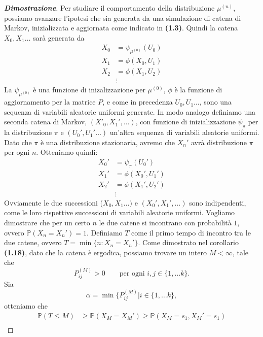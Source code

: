 \documentclass{article}
\theoremstyle{definition}
\theoremstyle{definition}
\theoremstyle{remark}
\begin{document}
\begin{proof}[\textbf{Dimostrazione}]
    Per studiare il comportamento della distribuzione $\mu^{(n)}$, possiamo avanzare l'ipotesi che sia generata da una simulazione
    di catena di Markov, inizializzata e aggiornata come indicato in \textbf{(1.3)}. Quindi la catena $X_0,X_1\dots$ sarà generata da
    \begin{align*}
        X_0 & = \psi_{\mu^{(0)}}(U_0) \\
        X_1 & = \phi(X_0,U_1)         \\
        X_2 & = \phi(X_1,U_2)         \\
            & \vdots
    \end{align*}
    La $\psi_{\mu^{(0)}}$ è  una funzione di inizalizzazione per $\mu^{(0)}$, $\phi$ è la funzione di aggiornamento per la matrice $P$, e come in precedenza
    $U_0,U_1\dots$, sono una sequenza di variabili aleatorie uniformi generate.
    In modo analogo definiamo una seconda catena di Markov, $(X'_0,X_1',\dots)$, con funzione di inizializzazione $\psi_{\pi}$ per la distribuzione $\pi$ e $(U_0',U_1'\dots)$ un'altra sequenza di variabili aleatorie uniformi.
    Dato che $\pi$ è una distribuzione stazionaria, avremo che $X_n'$ avrà distribuzione $\pi$ per ogni $n$. Otteniamo quindi:
    \begin{align*}
        X_0' & = \psi_{\pi}(U_0') \\
        X_1' & = \phi(X_0',U_1')  \\
        X_2' & = \phi(X_1',U_2')  \\
             & \vdots
    \end{align*}
    Ovviamente le due successioni ($X_0,X_1\dots)$ e $(X_0',X_1',\dots)$ sono indipendenti, come le loro rispettive successioni di variabili aleatorie uniformi. Vogliamo dimostrare che per un certo $n$ le due catene si incontrano con probabilità $1$, ovvero $\mathbb{P}(X_n = X_n') = 1$.
    Definiamo $T$ come il primo tempo di incontro tra le due catene, ovvero $T  =\min\{n:X_n = X_n'\}$. Come dimostrato nel corollario \textbf{(1.18)}, dato che la catena è ergodica, possiamo trovare un intero $M<\infty$, tale che
    $$P_{ij}^{(M)}>0\qquad \text{per ogni }i,j\in\{1,\dots k\}.$$
    Sia
    $$\alpha = \min\{P_{ij}^{(M)}| i\in\{1,\dots k\},$$
    otteniamo che
    \begin{align*}
        \mathbb{P}(T\le M) & \ge \mathbb{P}(X_M = X_M')  \ge\mathbb{P}(X_M = s_1, X_M' = s_1)                                                                                                \\

\end{align*}
\end{proof}
\end{document}
